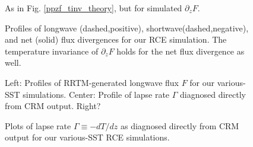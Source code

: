 \documentclass[10pt]{article}
\newcommand{\ppz}{\ensuremath{\partial_z}}
\begin{document}
\begin{figure}[h]
	\begin{center}
		\caption{As in Fig. \ref{ppzf_tinv_theory}, but for simulated $\ppz F$.
		\label{ppzf_tinv_dam}
		}
	\end{center}
\end{figure}

\begin{figure}[h]
	\begin{center}
		\caption{Profiles of longwave (dashed,positive), shortwave(dashed,negative), and net (solid) flux divergences for our RCE simulation. The temperature invariance of $\ppz F$ holds for the net flux divergence as well.
		\label{ppzf_net}
		}
	\end{center}
\end{figure}

\begin{figure}[h]
	\begin{center}
		\caption{Left: Profiles of RRTM-generated longwave flux $F$ for our various-SST simulations. Center: Profile of lapse rate $\Gamma$ diagnosed directly from CRM output. Right?
		\label{fluxes}
		}
	\end{center}
\end{figure}

\begin{figure}[h]
	\begin{center}
		\caption{Plots of lapse rate $\Gamma \equiv - dT/dz$ as diagnosed directly from CRM output for our various-SST RCE simulations.
		\label{lapse_rates}
		}
	\end{center}
\end{figure}






%
\end{document}

